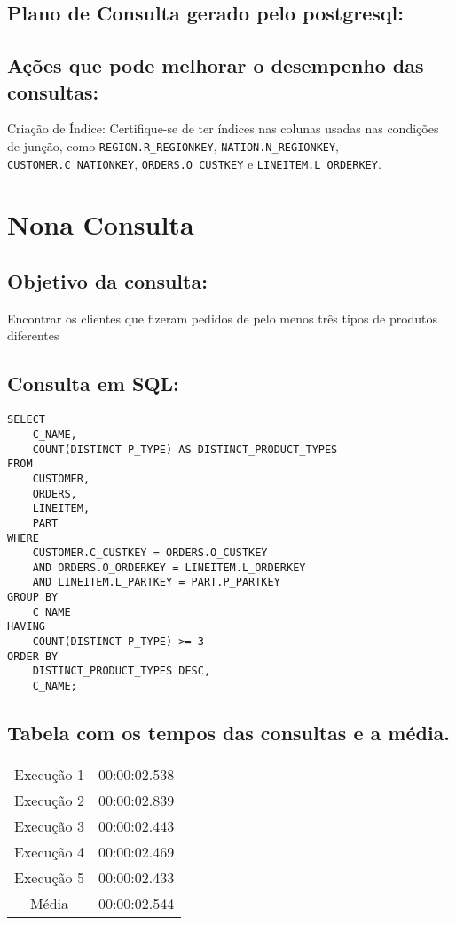 \documentclass[12pt]{article}
\begin{document}
\begin{landscape}
\subsection{Plano de Consulta gerado pelo postgresql:}

\subsection{Ações que pode melhorar o desempenho das 
consultas:} Criação de Índice: Certifique-se de ter índices nas colunas usadas nas condições de junção, como \texttt{REGION.R\_REGIONKEY}, \texttt{NATION.N\_REGIONKEY}, \texttt{CUSTOMER.C\_NATIONKEY}, \texttt{ORDERS.O\_CUSTKEY} e \texttt{LINEITEM.L\_ORDERKEY}.
\section{Nona Consulta}


\subsection{Objetivo da consulta:}
Encontrar os clientes que fizeram pedidos de pelo menos três tipos de produtos diferentes

\subsection{Consulta em SQL:}
\begin{lstlisting}
SELECT
    C_NAME,
    COUNT(DISTINCT P_TYPE) AS DISTINCT_PRODUCT_TYPES
FROM
    CUSTOMER,
    ORDERS,
    LINEITEM,
    PART
WHERE
    CUSTOMER.C_CUSTKEY = ORDERS.O_CUSTKEY
    AND ORDERS.O_ORDERKEY = LINEITEM.L_ORDERKEY
    AND LINEITEM.L_PARTKEY = PART.P_PARTKEY
GROUP BY
    C_NAME
HAVING
    COUNT(DISTINCT P_TYPE) >= 3
ORDER BY
    DISTINCT_PRODUCT_TYPES DESC,
    C_NAME;

\end{lstlisting}

\subsection{Tabela com os tempos das consultas e a média.}
\begin{tabular}{|c|c|}
  \hline
  Execução 1 & 00:00:02.538 \\
  Execução 2 & 00:00:02.839 \\
  Execução 3 & 00:00:02.443 \\
  Execução 4 & 00:00:02.469 \\
  Execução 5 & 00:00:02.433 \\
  \hline
  Média & 00:00:02.544 \\
  \hline
\end{tabular}


\end{landscape}
\end{document}
